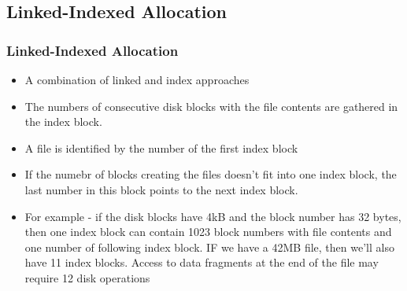 \documentclass{beamer}
\begin{document}
\subsection{Linked-Indexed Allocation}
\begin{frame}
\frametitle{Linked-Indexed Allocation}
\begin{itemize}
\item A combination of linked and index approaches
\item The numbers of consecutive disk blocks with the file contents are gathered in the index block.
\item A file is identified by the number of the first index block
\item If the numebr of blocks creating the files doesn't fit into one index block, the last number in this block points to the next index block.
\item For example - if the disk blocks have 4kB and the block number has 32 bytes, then one index block can contain 1023 block numbers with file contents and one number of following index block. IF we have a 42MB file, then we'll also have 11 index blocks. Access to data fragments at the end of the file may require 12 disk operations
\end{itemize}
\end{frame}
\end{document}
